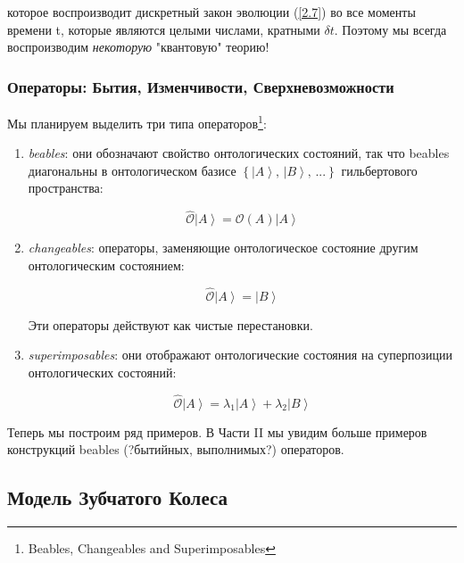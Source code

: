 \documentclass[main.tex]{subfiles}
\begin{document}
которое воспроизводит дискретный закон эволюции (\ref{2.7}) во все моменты времени t, которые являются целыми числами, кратными $\delta t$. Поэтому мы всегда воспроизводим \textit{некоторую} "квантовую" теорию!

\subsubsection{Операторы: Бытия, Изменчивости, Сверхневозможности}\label{ch2.1.1}

Мы планируем выделить три типа операторов\footnote{Beables, Changeables and Superimposables}:

\begin{enumerate}
	\item \textit{beables}: они обозначают свойство онтологических состояний, так что beables диагональны в онтологическом базисе $\left\{ \left|A\right>,\,\left|B\right>,\,... \right\}$ гильбертового пространства:

	\begin{equation}\label{2.10}
		\hat{\mathcal{O}} \left|A\right> = \mathcal{O}(A) \left|A\right>
	\end{equation}

	\item \textit{changeables}: операторы, заменяющие онтологическое состояние другим онтологическим состоянием:

	\begin{equation}\label{2.11}
		\hat{\mathcal{O}} \left|A\right> = \left|B\right>
	\end{equation}

	Эти операторы действуют как чистые перестановки.
	\item \textit{superimposables}: они отображают онтологические состояния на суперпозиции онтологических состояний:

	\begin{equation}\label{2.12}
		\hat{\mathcal{O}} \left|A\right> = \lambda_1\left|A\right> + \lambda_2\left|B\right>
	\end{equation}

\end{enumerate}

Теперь мы построим ряд примеров. В Части II мы увидим больше примеров конструкций beables (?бытийных, выполнимых?) операторов.


\subsection{Модель Зубчатого Колеса}\label{ch2.2}
\end{document}
